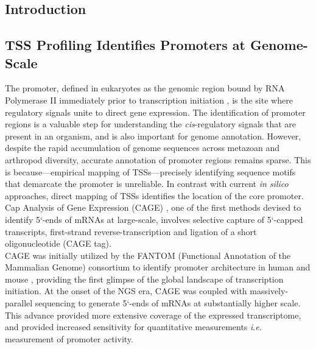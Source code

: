 \documentclass[runningheads,a4paper]{llncs}
\begin{document}
\begin{linenumbers}
\section{Introduction}

\subsection{TSS Profiling Identifies Promoters at Genome-Scale}
The promoter, defined in eukaryotes as the genomic region bound by RNA Polymerase II immediately prior to transcription initiation \cite{Kadonaga:2011gz}, is the site where regulatory signals unite to direct gene expression.
The identification of promoter regions is a valuable step for understanding the \textit{cis}-regulatory signals that are present in an organism, and is also important for genome annotation.
However, despite the rapid accumulation of genome sequences across metazoan and arthropod diversity, accurate annotation of promoter regions remains sparse. 
This is because---empirical mapping of TSSs---precisely identifying sequence motifs that demarcate the promoter is unreliable.
In contrast with current \textit{in silico} approaches, direct mapping of TSSs identifies the location of the core promoter.
Cap Analysis of Gene Expression (CAGE) \cite{Kodzius:2006gy}, one of the first methods devised to identify 5`-ends of mRNAs at large-scale, involves selective capture of 5`-capped transcripts, first-strand reverse-transcription and ligation of a short oligonucleotide (CAGE tag). \\
CAGE was initially utilized by the FANTOM (Functional Annotation of the Mammalian Genome) consortium to identify promoter architecture in human and mouse \cite{Carninci:2005kp}, providing the first glimpse of the global landscape of transcription initiation.
At the onset of the NGS era, CAGE was coupled with massively-parallel sequencing to generate 5`-ends of mRNAs at substantially higher scale. 
This advance provided more extensive coverage of the expressed transcriptome, and provided increased sensitivity for quantitative measurements \textit{i}.\textit{e}. measurement of promoter activity.


\end{linenumbers}
\end{document}
